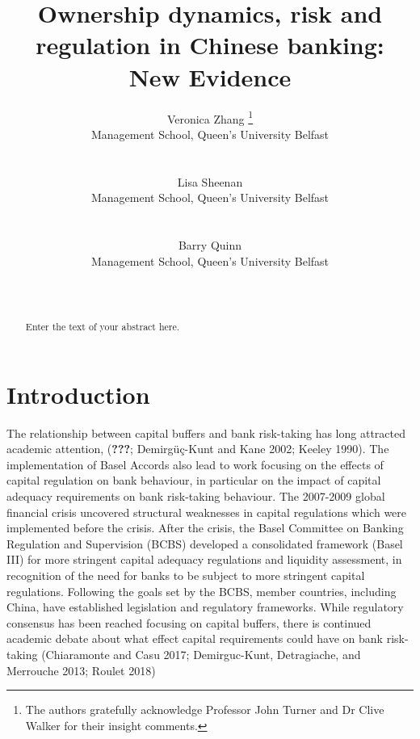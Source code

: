 \documentclass{article}
\title{Ownership dynamics, risk and regulation in Chinese banking: New Evidence}
\author{
    Veronica Zhang
    \thanks{The authors gratefully acknowledge Professor John Turner and Dr Clive
Walker for their insight comments.}
   \\
    Management School, Queen's University Belfast \\
   \\
  \texttt{} \\
   \And
    Lisa Sheenan
   \\
    Management School, Queen's University Belfast \\
   \\
  \texttt{} \\
   \And
    Barry Quinn
   \\
    Management School, Queen's University Belfast \\
   \\
  \texttt{} \\
  }
\begin{document}
\maketitle

\def\tightlist{}


\begin{abstract}
Enter the text of your abstract here.
\end{abstract}


\hypertarget{introduction}{%
\section{Introduction}\label{introduction}}

\label{sec:intro}

The relationship between capital buffers and bank risk-taking has long
attracted academic attention, ({\textbf{???}}; Demirgüç-Kunt and Kane
2002; Keeley 1990). The implementation of Basel Accords also lead to
work focusing on the effects of capital regulation on bank behaviour, in
particular on the impact of capital adequacy requirements on bank
risk-taking behaviour. The 2007-2009 global financial crisis uncovered
structural weaknesses in capital regulations which were implemented
before the crisis. After the crisis, the Basel Committee on Banking
Regulation and Supervision (BCBS) developed a consolidated framework
(Basel III) for more stringent capital adequacy regulations and
liquidity assessment, in recognition of the need for banks to be subject
to more stringent capital regulations. Following the goals set by the
BCBS, member countries, including China, have established legislation
and regulatory frameworks. While regulatory consensus has been reached
focusing on capital buffers, there is continued academic debate about
what effect capital requirements could have on bank risk-taking
(Chiaramonte and Casu 2017; Demirguc-Kunt, Detragiache, and Merrouche
2013; Roulet 2018)
\end{document}
